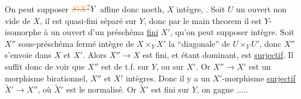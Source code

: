 On peut supposer $\deleted{\unsure{S|X}}Y$ affine donc noeth,  $X$ intègre,  . Soit $U$ un ouvert  non vide de $X$, il est quasi-fini séparé sur $Y$, donc par le main theorem il est $Y$-isomorphe
à un ouvert d'un  préschéma \uline{fini} $X'$, qu'on peut supposer intègre. Soit $X''$  sous-préschéma fermé intègre de $X\times_Y X'$   la ``diagonale'' de $U\times_Y U'$, donc $X''$ s'envoie dans $X$ et $X'$. Alors $X''\to X$ est fini, et étant dominant, est \uline{surjectif}. Il suffit donc de voir que $X''$ est de t.f. sur $Y$, ou  sur $X'$. Or $X''\to X'$ est un morphisme birationnel,  $X''$ et $X'$ intègres. Donc il y a un $X'$-morphisme \uline{surjectif} $\widetilde X'\to X''$, où $\widetilde X'$ est le normalisé. Or $\widetilde X'$ est fini sur $Y$, on gagne .....

